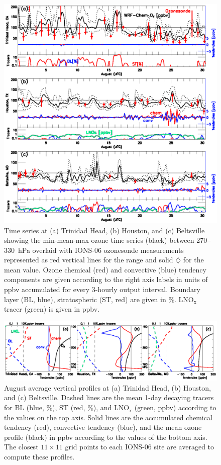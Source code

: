  \begin{figure}
 \noindent\includegraphics[width=40pc]{figures/tendency_ts.eps}
 \caption{Time series at (a) Trinidad Head, (b) Houston, and (c) Beltsville
showing the min-mean-max ozone time series (black) between
270--330~hPa overlaid with IONS-06 ozonesonde measurements
represented as red vertical lines for the range and solid $\diamondsuit$
for the mean value. Ozone chemical (red) and convective (blue) tendency
components are given according to the right axis labels in units
of ppbv accumulated for every 3-hourly output interval. Boundary layer (BL, blue), stratospheric (ST, red) are
given in \%. LNO$_{\mathrm{x}}$ tracer (green) is given in ppbv.}
 \label{fig:tend_ts}
 \end{figure}

 \begin{figure}
 \noindent\includegraphics[width=40pc]{figures/tendency_v.eps}
 \caption{August average vertical profiles at (a) Trinidad Head, (b) Houston, and (c)
Beltsville. Dashed lines are the mean 1-day decaying tracers for BL (blue, \%),
ST (red, \%), and LNO$_{\mathrm{x}}$ (green, ppbv) according to the
values on the top axis. Solid lines are the accumulated chemical
tendency (red), convective tendency (blue), and the mean ozone profile
(black) in ppbv according to the values of the bottom axis. The closest
$11\times11$ grid points to each IONS-06 site are averaged to compute
these profiles.}
 \label{fig:tend_v}
 \end{figure}

